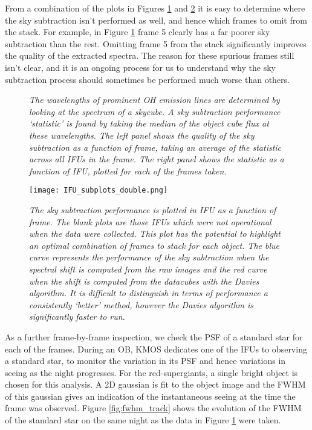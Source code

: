 \documentclass{literature}
\begin{document}
From a combination of the plots in Figures \ref{fig:sky_sub_perf} and \ref{fig:ifu_subplots} it is easy to determine where the sky subtraction isn't performed as well, and hence which frames to omit from the stack. For example, in Figure \ref{fig:sky_sub_perf} frame 5 clearly has a far poorer sky subtraction than the rest. Omitting frame 5 from the stack significantly improves the quality of the extracted spectra. The reason for these spurious frames still isn't clear, and it is an ongoing process for us to understand why the sky subtraction process should sometimes be performed much worse than others. 


\begin{figure}[!htp]
\centering
{}
\caption{\footnotesize{\emph{The wavelengths of prominent OH emission lines are determined by looking at the spectrum of a skycube. A sky subtraction performance `statistic' is found by taking the median of the object cube flux at these wavelengths. The left panel shows the quality of the sky subtraction as a function of frame, taking an average of the statistic across all IFUs in the frame. The right panel shows the statistic as a function of IFU, plotted for each of the frames taken.}}}
\label{fig:sky_sub_perf}
\end{figure}

\begin{figure}[!htp]
\centering
\texttt{[image: IFU\_subplots\_double.png]}
\caption{\footnotesize{\emph{The sky subtraction performance is plotted in IFU as a function of frame. The blank plots are those IFUs which were not operational when the data were collected. This plot has the potential to highlight an optimal combination of frames to stack for each object. The blue curve represents the performance of the sky subtraction when the spectral shift is computed from the raw images and the red curve when the shift is computed from the datacubes with the Davies algorithm. It is difficult to distinguish in terms of performance a consistently `better' method, however the Davies algorithm is significantly faster to run.}}}
\label{fig:ifu_subplots}
\end{figure}

As a further frame-by-frame inspection, we check the PSF of a standard star for each of the frames. During an OB, KMOS dedicates one of the IFUs to observing a standard star, to monitor the variation in its PSF and hence variations in seeing as the night progresses. For the red-supergiants, a single bright object is chosen for this analysis. A 2D gaussian is fit to the object image and the FWHM of this gaussian gives an indication of the instantaneous seeing at the time the frame was observed. Figure \ref{fig:fwhm_track} shows the evolution of the FWHM of the standard star on the same night as the data in Figure \ref{fig:sky_sub_perf} were taken.
\end{document}
